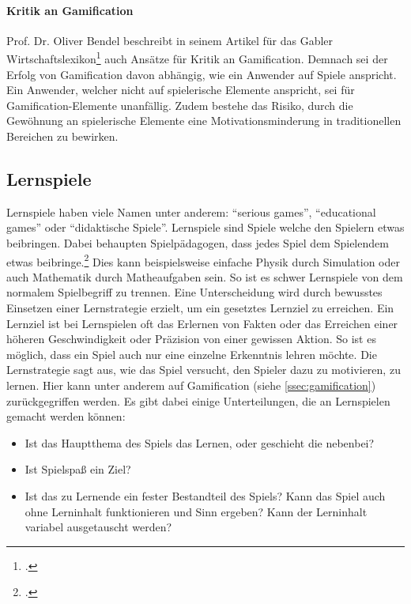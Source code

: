     \paragraph{Kritik an Gamification}
    Prof. Dr. Oliver Bendel beschreibt in seinem Artikel für das Gabler Wirtschaftslexikon\footcite{gabler-gamification} auch Ansätze für Kritik an Gamification. Demnach sei der Erfolg von Gamification davon abhängig, wie ein Anwender auf Spiele anspricht. Ein Anwender, welcher nicht auf spielerische Elemente anspricht, sei für Gamification-Elemente unanfällig. Zudem bestehe das Risiko, durch die Gewöhnung an spielerische Elemente eine Motivationsminderung in traditionellen Bereichen zu bewirken.

\subsection{Lernspiele}
	Lernspiele haben viele Namen unter anderem: \enquote{serious games}, \enquote{educational games} oder \enquote{didaktische Spiele}.
	Lernspiele sind Spiele welche den Spielern etwas beibringen. Dabei behaupten Spielpädagogen, dass jedes Spiel dem Spielendem etwas beibringe.\footcite{lernspiel} Dies kann beispielsweise einfache Physik durch Simulation oder auch Mathematik durch Matheaufgaben sein. So ist es schwer Lernspiele von dem normalem Spielbegriff zu trennen. Eine Unterscheidung wird durch bewusstes Einsetzen einer Lernstrategie erzielt, um ein gesetztes Lernziel zu erreichen.
	Ein Lernziel ist bei Lernspielen oft das Erlernen von Fakten oder das Erreichen einer höheren Geschwindigkeit oder Präzision von einer gewissen Aktion. So ist es möglich, dass ein Spiel auch nur eine einzelne Erkenntnis lehren möchte.
	Die Lernstrategie sagt aus, wie das Spiel versucht, den Spieler dazu zu motivieren, zu lernen. Hier kann unter anderem auf Gamification (siehe \ref{ssec:gamification}) zurückgegriffen werden.
	Es gibt dabei einige Unterteilungen, die an Lernspielen gemacht werden können:
	\begin{itemize}
		\item{ Ist das Hauptthema des Spiels das Lernen, oder geschieht die nebenbei?}
		\item{ Ist Spielspaß ein Ziel? }
		\item{ Ist das zu Lernende ein fester Bestandteil des Spiels? Kann das Spiel auch ohne Lerninhalt funktionieren und Sinn ergeben? Kann der Lerninhalt variabel ausgetauscht werden? }
	\end{itemize}
